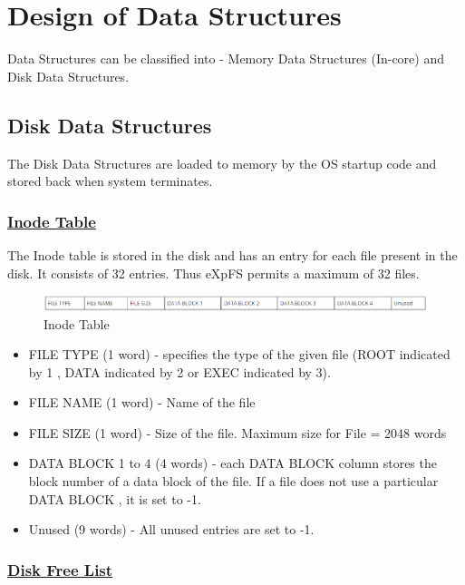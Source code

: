 \chapter{Design of Data Structures}
\label{chap8}

Data Structures can be classified into - Memory Data Structures (In-core) and Disk Data Structures. 
\section{Disk Data Structures}
The Disk Data Structures are loaded to memory by the OS startup code and stored back when system terminates.
\subsection{\href{http://exposnitc.github.io/os_design-files/disk_ds.html#inode_table}{Inode Table}}

The Inode table is stored in the disk and has an entry for each file present in the disk. It consists of 32 entries. Thus eXpFS permits a maximum of 32 files.
\begin{figure}[ht]
\centering
\includegraphics [scale=0.55]{figures/INODE.png}
\caption{\footnotesize Inode Table}
\end{figure}

\begin{itemize}
\item FILE TYPE (1 word) - specifies the type of the given file (ROOT indicated by 1 , DATA indicated by 2 or EXEC indicated by 3). 
\item FILE NAME (1 word) - Name of the file
\item FILE SIZE (1 word) - Size of the file. Maximum size for File = 2048 words
\item DATA BLOCK 1 to 4 (4 words) - each DATA BLOCK column stores the block number of a data block of the file. If a file does not use a particular DATA BLOCK , it is set to -1.
\item Unused (9 words) - All unused entries are set to -1.
\end{itemize}



\subsection{\href{http://exposnitc.github.io/os_design-files/disk_ds.html#disk_free_list}{Disk Free List}}

